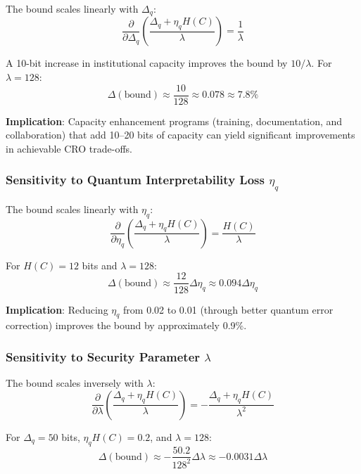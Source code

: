 \documentclass{ieeeaccess}
\begin{document}
The bound scales linearly with $\Delta_q$:
\begin{equation}
    \frac{\partial}{\partial \Delta_q}\left(\frac{\Delta_q + \eta_q H(C)}{\lambda}\right) = \frac{1}{\lambda}
\end{equation}

A 10-bit increase in institutional capacity improves the bound by $10/\lambda$. For $\lambda = 128$:
\begin{equation}
    \Delta(\text{bound}) \approx \frac{10}{128} \approx 0.078 \approx 7.8\%
\end{equation}

\textbf{Implication}: Capacity enhancement programs (training, documentation, and collaboration) that add 10--20 bits of capacity can yield significant improvements in achievable CRO trade-offs.

\subsubsection{Sensitivity to Quantum Interpretability Loss $\eta_q$}

The bound scales linearly with $\eta_q$:
\begin{equation}
    \frac{\partial}{\partial \eta_q}\left(\frac{\Delta_q + \eta_q H(C)}{\lambda}\right) = \frac{H(C)}{\lambda}
\end{equation}

For $H(C) = 12$ bits and $\lambda = 128$:
\begin{equation}
    \Delta(\text{bound}) \approx \frac{12}{128} \Delta\eta_q \approx 0.094 \Delta\eta_q
\end{equation}

\textbf{Implication}: Reducing $\eta_q$ from 0.02 to 0.01 (through better quantum error correction) improves the bound by approximately 0.9\%.

\subsubsection{Sensitivity to Security Parameter $\lambda$}

The bound scales inversely with $\lambda$:
\begin{equation}
    \frac{\partial}{\partial \lambda}\left(\frac{\Delta_q + \eta_q H(C)}{\lambda}\right) = -\frac{\Delta_q + \eta_q H(C)}{\lambda^2}
\end{equation}

For $\Delta_q = 50$ bits, $\eta_q H(C) = 0.2$, and $\lambda = 128$:
\begin{equation}
    \Delta(\text{bound}) \approx -\frac{50.2}{128^2} \Delta\lambda \approx -0.0031 \Delta\lambda
\end{equation}
\end{document}
